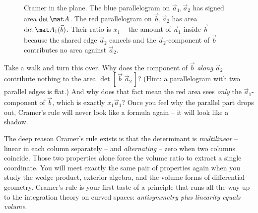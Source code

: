 \begin{figure}[H]
\centering
{}
\caption{Cramer in the plane. The blue parallelogram on $\vec a_1,\vec a_2$ has signed area $\det\mat
A$. The red parallelogram on $\vec b,\vec a_2$ has area $\det\mat A_1(\vec b)$. Their ratio is $x_1$ --
the amount of $\vec a_1$ inside $\vec b$ -- because the shared edge $\vec a_2$ cancels and the
$\vec a_2$-component of $\vec b$ contributes no area against $\vec a_2$.}
\label{ch22:fig-cramer}
\end{figure}

\begin{walkbox}
Take a walk and turn this over. Why does the component of $\vec b$ \emph{along} $\vec a_2$ contribute
nothing to the area $\det[\,\vec b\;\vec a_2\,]$? (Hint: a parallelogram with two parallel edges is
flat.) And why does that fact mean the red area sees \emph{only} the $\vec a_1$-component of $\vec b$,
which is exactly $x_1\vec a_1$? Once you feel why the parallel part drops out, Cramer's rule will
never look like a formula again -- it will look like a shadow.
\end{walkbox}

\begin{aestheticbox}
The deep reason Cramer's rule exists is that the determinant is \emph{multilinear} -- linear in each
column separately -- and \emph{alternating} -- zero when two columns coincide. Those two properties
alone force the volume ratio to extract a single coordinate. You will meet exactly the same pair of
properties again when you study the wedge product, exterior algebra, and the volume forms of
differential geometry. Cramer's rule is your first taste of a principle that runs all the way up to
the integration theory on curved spaces: \emph{antisymmetry plus linearity equals volume}.
\end{aestheticbox}

